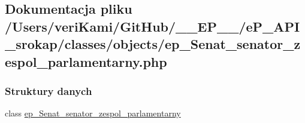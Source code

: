 \hypertarget{ep___senat__senator__zespol__parlamentarny_8php}{\subsection{Dokumentacja pliku /\-Users/veri\-Kami/\-Git\-Hub/\-\_\-\-\_\-\-E\-P\-\_\-\-\_\-/e\-P\-\_\-\-A\-P\-I\-\_\-srokap/classes/objects/ep\-\_\-\-Senat\-\_\-senator\-\_\-zespol\-\_\-parlamentarny.php}
\label{ep___senat__senator__zespol__parlamentarny_8php}
}
\subsubsection*{Struktury danych}
\begin{DoxyCompactItemize}
\item 
class \hyperlink{classep___senat__senator__zespol__parlamentarny}{ep\-\_\-\-Senat\-\_\-senator\-\_\-zespol\-\_\-parlamentarny}
\end{DoxyCompactItemize}
